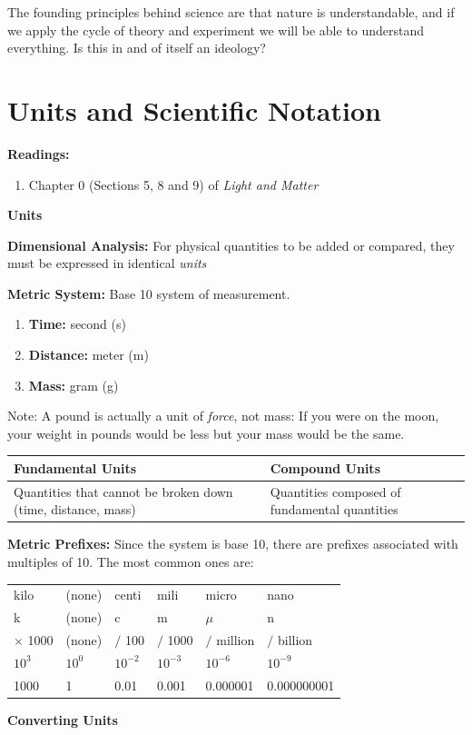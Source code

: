 \documentclass[12pt]{article}
\begin{document}
The founding principles behind science are that nature is understandable, and if we apply the cycle of theory and experiment we will be able to understand everything. Is this in and of itself an ideology?

\section{Units and Scientific Notation}

\noindent \textbf{Readings:}
\begin{enumerate}
\item Chapter 0 (Sections 5, 8 and 9) of \textit{Light and Matter}
\end{enumerate}
	
\noindent \textbf{\large Units}
	
\noindent \textbf{Dimensional Analysis:} For physical quantities to be added or compared, they must be expressed in identical \textit{units}

\noindent \textbf{Metric System:} Base 10 system of measurement.

\begin{enumerate}
	\item \textbf{Time:} second (s)
	\item \textbf{Distance:} meter (m)
	\item \textbf{Mass:} gram (g)
\end{enumerate}

Note: A pound is actually a unit of \textit{force}, not mass: If you were on the moon, your weight in pounds would be less but your mass would be the same.
\vspace{0.1in}

\noindent \begin{tabularx}{\textwidth}{X | X}
	Fundamental Units & Compound Units \\ \hline
	Quantities that cannot be broken down (time, distance, mass) & Quantities composed of fundamental quantities
\end{tabularx}

\vspace{0.1in}
\noindent \textbf{Metric Prefixes:} Since the system is base 10, there are prefixes associated with multiples of 10. The most common ones are:
\vspace{0.1in}

\noindent \begin{tabularx}{\textwidth}{ X X X X X X }
	kilo & (none) & centi & mili & micro & nano \\
	k & (none) & c & m & $\mu$ & n \\
	$\times$ 1000 & (none) & $/$ 100 & $/$ 1000 & $/$ million & $/$ billion \\
	$10^3$ & $10^0$ & $10^{-2}$ & $10^{-3}$ & $10^{-6}$ & $10^{-9}$ \\
	1000 & 1 & 0.01 & 0.001 & 0.000001 & 0.000000001 
\end{tabularx}
\clearpage
\noindent \textbf{\large Converting Units}
\end{document}
